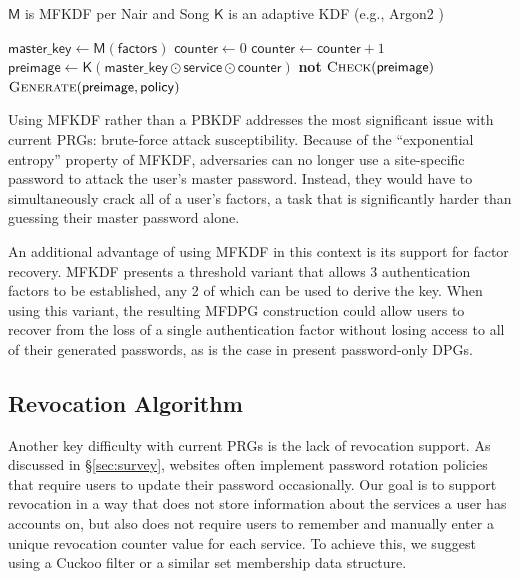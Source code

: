 \begin{algorithm}[H]
\caption{MFDPG Algorithm}
\label{alg:mfdpg}
\begin{algorithmic}[1]
\Require $\mathsf{M}$ is MFKDF per Nair and Song \cite{mfkdf}
\Require $\mathsf{K}$ is an adaptive KDF (e.g., Argon2 \cite{argon2})

    \State $\mathsf{master\_key} \gets \mathsf{M}(\mathsf{factors})$
    \State $\mathsf{counter} \gets 0$
    \Repeat
        \State $\mathsf{counter} \gets \mathsf{counter} + 1$
        \State $\mathsf{preimage} \gets \mathsf{K}(\mathsf{master\_key} \odot \mathsf{service} \odot \mathsf{counter})$
    \Until \textbf{not} {$\textsc{Check}(\mathsf{preimage})$}
    \State \Return $\textsc{Generate}(\mathsf{preimage}, \mathsf{policy})$
\EndFunction

\end{algorithmic}
\end{algorithm}

Using MFKDF rather than a PBKDF addresses the most significant issue with current PRGs: brute-force attack susceptibility. Because of the ``exponential entropy'' property of MFKDF, adversaries can no longer use a site-specific password to attack the user's master password. Instead, they would have to simultaneously crack all of a user's factors, a task that is significantly harder than guessing their master password alone.

An additional advantage of using MFKDF in this context is its support for factor recovery. MFKDF presents a threshold variant that allows 3 authentication factors to be established, any 2 of which can be used to derive the key. When using this variant, the resulting MFDPG construction could allow users to recover from the loss of a single authentication factor without losing access to all of their generated passwords, as is the case in present password-only DPGs.

\subsection{Revocation Algorithm}
\label{sec:revocation}

Another key difficulty with current PRGs is the lack of revocation support. As discussed in \S\ref{sec:survey}, websites often implement password rotation policies that require users to update their password occasionally. Our goal is to support revocation in a way that does not store information about the services a user has accounts on, but also does not require users to remember and manually enter a unique revocation counter value for each service. To achieve this, we suggest using a Cuckoo filter \cite{fan2014cuckoo} or a similar set membership data structure.

